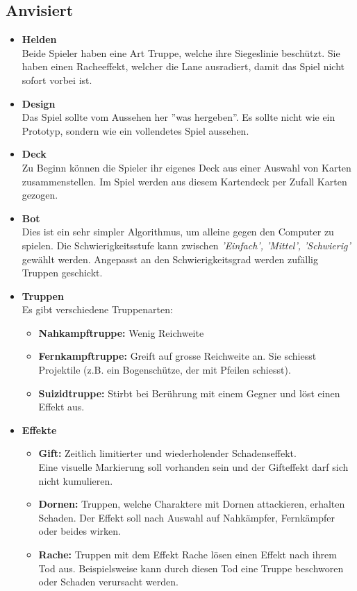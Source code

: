 \subsection{Anvisiert}
\begin{itemize}
    \item \textbf{\gls{Helden}} \\
        Beide Spieler haben eine Art Truppe, welche ihre Siegeslinie beschützt. Sie haben einen Racheeffekt, welcher die
        Lane ausradiert, damit das Spiel nicht sofort vorbei ist.
    \item \textbf{Design} \\
        Das Spiel sollte vom Aussehen her ''was hergeben''. Es sollte nicht wie ein Prototyp, sondern wie ein 
        vollendetes Spiel aussehen. 
    \item \textbf{Deck} \\
        Zu Beginn können die Spieler ihr eigenes Deck aus einer Auswahl von Karten zusammenstellen. Im Spiel werden aus diesem Kartendeck per Zufall Karten gezogen.
    \item \textbf{Bot} \\
        Dies ist ein sehr simpler Algorithmus, um alleine gegen den Computer zu spielen. Die Schwierigkeitsstufe kann zwischen \textit{'Einfach', 'Mittel', 'Schwierig'} gewählt werden.
        Angepasst an den Schwierigkeitsgrad werden zufällig Truppen geschickt.
    \item \textbf{Truppen}\\
    Es gibt verschiedene Truppenarten:
    \begin{itemize}
        \item \textbf{Nahkampftruppe:}
            Wenig Reichweite
        \item \textbf{Fernkampftruppe:}
            Greift auf grosse Reichweite an. Sie schiesst Projektile (z.B. ein Bogenschütze, der mit Pfeilen schiesst).
        \item \textbf{Suizidtruppe:}
            Stirbt bei Berührung mit einem Gegner und löst einen Effekt aus.
    \end{itemize}
    \item \textbf{Effekte}
    \begin{itemize}
        \item \textbf{Gift:}
            Zeitlich limitierter und wiederholender Schadenseffekt. \\Eine visuelle Markierung soll vorhanden sein
            und der Gifteffekt darf sich nicht kumulieren.
        \item \textbf{Dornen:}
            Truppen, welche Charaktere mit Dornen attackieren, erhalten Schaden. Der Effekt soll nach Auswahl auf Nahkämpfer,
            Fernkämpfer oder beides wirken.
        \item \textbf{Rache:}
            Truppen mit dem Effekt Rache lösen einen Effekt nach ihrem Tod aus. Beispielsweise kann durch diesen Tod eine Truppe beschworen oder Schaden verursacht werden.
    \end{itemize}
\end{itemize}

